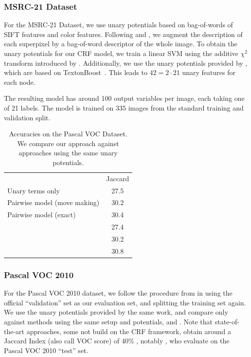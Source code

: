 \subsubsection{MSRC-21 Dataset}
For the MSRC-21 Dataset, we use unary potentials based on bag-of-words of SIFT
features and color features.  Following \citet{lucchi2011spatial} and
\citet{fulkerson2009class}, we augment the description of each superpixel by a
bag-of-word descriptor of the whole image. To obtain the unary potentials for
our CRF model, we train a linear SVM using the additive $\chi^2$ transform
introduced by \citet{vedaldi2010efficient}. Additionally, we use the unary
potentials provided by \citet{krahenbuhl2012efficient}, which are based on
TextonBoost~\citep{shotton2006textonboost}. This leads to $42 = 2 \cdot 21$
unary features for each node.

The resulting model has around 100 output variables per image, each taking one of 21
labels. The model is trained on 335 images from the standard training and
validation split.

\begin{table}
    \begin{center}
    \begin{tabularx}{\linewidth}{@{\extracolsep{\fill}}lc}
        \toprule
                    & Jaccard \\
        \cmidrule{1-2}
    Unary terms only &  27.5 \\
    Pairwise model (move making)& 30.2\\
    Pairwise model (exact) & 30.4\\
        \cmidrule{1-2}
    \citet{dann2012pottics} & 27.4\\
    \citet{krahenbuhl2012efficient} & 30.2\\
    \citet{krahenbuhlparameter} & 30.8\\
    \bottomrule
    \end{tabularx}
    \end{center}
    \caption{Accuracies on the Pascal VOC Dataset. We compare our approach
    against approaches using the same unary potentials.\label{pascalacc}}
    
\end{table}


\subsubsection{Pascal VOC 2010}
For the Pascal VOC 2010 dataset, we follow the procedure from \citet{krahenbuhl2012efficient}
in using the official ``validation'' set as our evaluation set, and splitting the training set again.
We use the unary potentials provided by the same work, and compare only against methods
using the same setup and potentials, \citet{krahenbuhlparameter} and \citet{dann2012pottics}.
Note that state-of-the-art approaches, some not build on the CRF framework, obtain
around a Jaccard Index (also call VOC score) of 40\% , notably \cite{xia2012segmentation}, who 
evaluate on the Pascal VOC 2010 ``test'' set.


